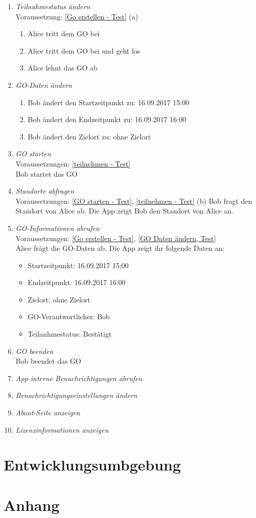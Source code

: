 \documentclass[parskip=full]{scrartcl}
\def\threedigits#1{%
  \ifnum#1<100 0\fi
  \ifnum#1<10 0\fi
  \number#1}
\begin{document}
\begin{enumerate}[label={\textbf{/T\protect\threedigits{\theenumi}0/}}, leftmargin=*, resume]
	\item \textit{Teilnahmestatus ändern}\\ \label{teilnehmen - Test}
	Voraussetzung: \ref{Go erstellen - Test} (a)
	\begin{enumerate}
		\item Alice tritt dem GO bei
		\item Alice tritt dem GO bei und geht los
		\item Alice lehnt das GO ab
	\end{enumerate}
	\item \textit{GO-Daten ändern} \label{GO Daten ändern, Test} \\
	\begin{enumerate}
		\item Bob ändert den Startzeitpunkt zu: 16.09.2017 15:00
		\item Bob ändert den Endzeitpunkt zu: 16.09.2017 16:00
		\item Bob ändert den Zielort zu: ohne Zielort
	\end{enumerate}
	\item \textit{GO starten} \label{GO starten - Test} \\
	Voraussetzungen: \ref{teilnehmen - Test} \\
	Bob startet das GO
	\item \textit{Standorte abfragen} \\
	Voraussetzungen: \ref{GO starten - Test}, \ref{teilnehmen - Test} (b)
	Bob fragt den Standort von Alice ab. Die App zeigt Bob den Standort von Alice an.
	\item \textit{GO-Informationen abrufen} \\
	Voraussetzungen: \ref{Go erstellen - Test}, \ref{GO Daten ändern, Test} \\
	Alice frägt die GO-Daten ab. Die App zeigt ihr folgende Daten an:
	\begin{itemize}
		\item Startzeitpunkt: 16.09.2017 15:00
		\item Endzeitpunkt: 16.09.2017 16:00
		\item Zielort: ohne Zielort
		\item GO-Verantwortlicher: Bob
		\item Teilanhmestatus: Bestätigt		
	\end{itemize}
	\item \textit{GO beenden} \\
	Bob beendet das GO
	\item \textit{App-interne Benachrichtigungen abrufen}
	\item \textit{Benachrichtigungseinstellungen ändern}
	\item \textit{About-Seite anzeigen}
	\item \textit{Lizenzinformationen anzeigen}
\end{enumerate}

\newpage
\section{Entwicklungsumbgebung}

\newpage
\section{Anhang}

\newpage
\printglossary	
\end{document}
